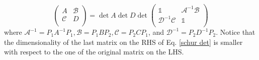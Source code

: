 \begin{equation}\label{schur det}
        \begin{pmatrix}
        A & \mathcal{B} \\
        \mathcal{C} & D \\
\end{pmatrix} = \det A \det D \det \begin{pmatrix}
    \mathbb{1} & \mathcal{A}^{-1}\mathcal{B} \\
    \mathcal{D}^{-1}\mathcal{C} & \mathbb{1} \\
\end{pmatrix}
\end{equation}
where $\mathcal{A}^{-1} = P_1 A^{-1} P_1, \mathcal{B} = P_1 B P_2, \mathcal{C} = P_2 C P_1$, and $\mathcal{D}^{-1} = P_2 D^{-1} P_2$. Notice that the dimensionality of the last matrix on the RHS of Eq. \eqref{schur det} is smaller with respect to the one of the original matrix on the LHS.